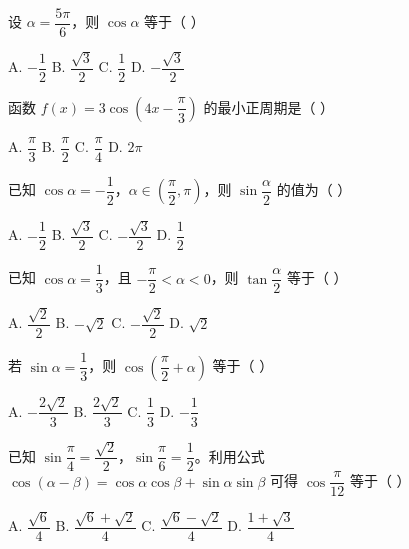 \documentclass[11pt, a4paper]{article}
\begin{document}
\begin{baitap}[12]
设 $\alpha=\dfrac{5\pi}{6}$，则 $\cos\alpha$ 等于（ ）
\par\vspace{3pt}
\noindent A. $-\dfrac{1}{2}$ \quad B. $\dfrac{\sqrt{3}}{2}$ \quad C. $\dfrac{1}{2}$ \quad D. $-\dfrac{\sqrt{3}}{2}$
\end{baitap}

\begin{baitap}[13]
函数 $f(x)=3\cos\!\left(4x-\dfrac{\pi}{3}\right)$ 的最小正周期是（ ）
\par\vspace{3pt}
\noindent A. $\dfrac{\pi}{3}$ \quad B. $\dfrac{\pi}{2}$ \quad C. $\dfrac{\pi}{4}$ \quad D. $2\pi$
\end{baitap}

\begin{baitap}[14]
已知 $\cos\alpha=-\dfrac{1}{2}$，$\alpha\in\left(\dfrac{\pi}{2},\pi\right)$，则 $\sin\dfrac{\alpha}{2}$ 的值为（ ）
\par\vspace{3pt}
\noindent A. $-\dfrac{1}{2}$ \quad B. $\dfrac{\sqrt{3}}{2}$ \quad C. $-\dfrac{\sqrt{3}}{2}$ \quad D. $\dfrac{1}{2}$
\end{baitap}

\begin{baitap}[15]
已知 $\cos\alpha=\dfrac{1}{3}$，且 $-\dfrac{\pi}{2}<\alpha<0$，则 $\tan\dfrac{\alpha}{2}$ 等于（ ）
\par\vspace{3pt}
\noindent A. $\dfrac{\sqrt{2}}{2}$ \quad B. $-\sqrt{2}$ \quad C. $-\dfrac{\sqrt{2}}{2}$ \quad D. $\sqrt{2}$
\end{baitap}

\begin{baitap}[16]
若 $\sin\alpha=\dfrac{1}{3}$，则 $\cos\!\left(\dfrac{\pi}{2}+\alpha\right)$ 等于（ ）
\par\vspace{3pt}
\noindent A. $-\dfrac{2\sqrt{2}}{3}$ \quad B. $\dfrac{2\sqrt{2}}{3}$ \quad C. $\dfrac{1}{3}$ \quad D. $-\dfrac{1}{3}$
\end{baitap}

\begin{baitap}[17]
已知 $\sin\dfrac{\pi}{4}=\dfrac{\sqrt{2}}{2}$，$\sin\dfrac{\pi}{6}=\dfrac{1}{2}$。利用公式 $\cos(\alpha-\beta)=\cos\alpha\cos\beta+\sin\alpha\sin\beta$ 可得 $\cos\dfrac{\pi}{12}$ 等于（ ）
\par\vspace{3pt}
\noindent A. $\dfrac{\sqrt{6}}{4}$ \quad B. $\dfrac{\sqrt{6}+\sqrt{2}}{4}$ \quad C. $\dfrac{\sqrt{6}-\sqrt{2}}{4}$ \quad D. $\dfrac{1+\sqrt{3}}{4}$
\end{baitap}
\end{document}
